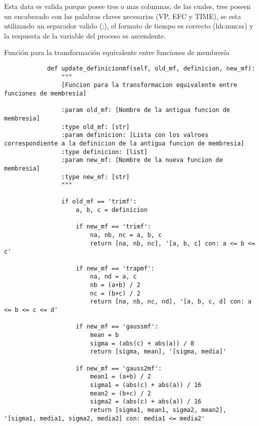     Esta data es valida porque posee tres o mas columnas, de las cuales, tres poseen un encabezado con las palabras claves necesarias (VP, EFC y TIME), se esta utilizando un separador valido (;), el formato de tiempo es correcto (hh:mm:ss) y la respuesta de la variable del proceso es ascendente.

    \begin{longlisting}
        \caption[Transformación equivalente entre funciones de membresía]{Función para la transformación equivalente entre funciones de membresía}
        \label{code:1}				
        \begin{verbatim}
            def update_definicionmf(self, old_mf, definicion, new_mf):
                """
                [Funcion para la transformacion equivalente entre funciones de membresia]
                
                :param old_mf: [Nombre de la antigua funcion de membresia]
                :type old_mf: [str]
                :param definicion: [Lista con los valroes correspondiente a la definicion de la antigua funcion de membresia]
                :type definicion: [list]
                :param new_mf: [Nombre de la nueva funcion de membresia]
                :type new_mf: [str]
                """
                
                if old_mf == 'trimf':
                    a, b, c = definicion

                    if new_mf == 'trimf':
                        na, nb, nc = a, b, c
                        return [na, nb, nc], '[a, b, c] con: a <= b <= c'

                    if new_mf == 'trapmf':
                        na, nd = a, c
                        nb = (a+b) / 2
                        nc = (b+c) / 2
                        return [na, nb, nc, nd], '[a, b, c, d] con: a <= b <= c <= d'

                    if new_mf == 'gaussmf':
                        mean = b
                        sigma = (abs(c) + abs(a)) / 8
                        return [sigma, mean], '[sigma, media]'

                    if new_mf == 'gauss2mf':
                        mean1 = (a+b) / 2
                        sigma1 = (abs(c) + abs(a)) / 16
                        mean2 = (b+c) / 2
                        sigma2 = (abs(c) + abs(a)) / 16
                        return [sigma1, mean1, sigma2, mean2], '[sigma1, media1, sigma2, media2] con: media1 <= media2'


\end{verbatim}
\end{longlisting}
